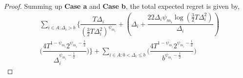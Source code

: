 \begin{proof}

 
Summing up \textbf{Case a} and \textbf{Case b}, the total expected regret is given by,
\begin{align*}
 &\sum\limits_{i\in A:\Delta_{i} > b}\bigg\lbrace \dfrac{T\Delta_{i}}{( \frac{3}{2} T\Delta_i^{2})^{\psi_{m_i}}}
  + \left( \Delta_i +\dfrac{22\Delta_i\psi_{m_i}\log( \frac{3}{2} T\Delta_i^2)}{ \Delta_i}\right)\\
  & \bigg(\dfrac{4T^{1-\psi_{m_i}}2^{\psi_{m_i}-\frac{1}{2}}}{\Delta_{i}^{\psi_{m_i}-\frac{1}{2}}} \bigg)\bigg \rbrace +\sum_{i\in A: 0 < \Delta_{i} \leq b}\bigg(\dfrac{4T^{1-\psi_{m_i}}2^{\psi_{m_i}-\frac{1}{2}}}{b^{\psi_{m_i}-\frac{1}{2}}} \bigg)
\end{align*}


\end{proof}